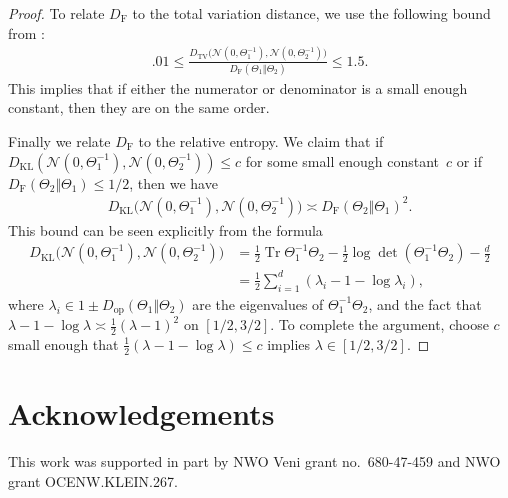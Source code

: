 \documentclass[aos]{imsart}
\theoremstyle{definition}
\numberwithin{equation}{section}
\DeclareMathOperator{\tr}{Tr}
\newcommand{\DF}{D_{\operatorname{F}}}
\newcommand{\Dop}{D_{\operatorname{op}}}
\newcommand{\DKL}{D_{\operatorname{KL}}}
\newcommand{\DTV}{D_{\operatorname{TV}}}
\begin{document}
\begin{appendix}
\begin{proof}
To relate $\DF$ to the total variation distance, we use the following bound from \cite{devroye2018total}:
\begin{align*}
  .01  \leq \frac{\DTV\bigl(\mathcal{N}(0, \Theta_1^{-1}), \mathcal{N}(0, \Theta_2^{-1})\bigr)}{\DF(\Theta_1 \Vert  \Theta_2)} \leq 1.5.
\end{align*}
This implies that if either the numerator or denominator is a small enough constant, then they are on the same order.

Finally we relate $\DF$ to the relative entropy.
We claim that if $\DKL(\mathcal{N}(0, \Theta_1^{-1}), \mathcal{N}(0, \Theta_2^{-1})) \leq c$ for some small enough constant~$c$ or if $\DF(\Theta_2 \Vert  \Theta_1) \leq 1/2$, then we have
\begin{align*}
  \DKL\bigl(\mathcal{N}(0, \Theta_1^{-1}), \mathcal{N}(0, \Theta_2^{-1})\bigr) \asymp \DF(\Theta_2 \Vert  \Theta_1)^2.
\end{align*}
This bound can be seen explicitly from the formula
\begin{align*}
  \DKL\bigl(\mathcal{N}(0, \Theta_1^{-1}), \mathcal{N}(0, \Theta_2^{-1})\bigr)
&= \frac{1}{2} \tr \Theta_1^{-1} \Theta_2 - \frac{1}{2}\log\det(\Theta_1^{-1} \Theta_2) - \frac{d}{2}\\
& = \frac{1}{2} \sum_{i =1}^d (\lambda_i -1 -  \log \lambda_i),
\end{align*}
where $\lambda_i \in 1 \pm \Dop(\Theta_1\Vert \Theta_2)$ are the eigenvalues of $\Theta_1^{-1} \Theta_2$,
and the fact that $\lambda - 1 -\log\lambda \asymp \frac12 (\lambda - 1)^2$ on $[1/2, 3/2]$.
To complete the argument, choose $c$ small enough that $\frac{1}{2}(\lambda - 1 -\log\lambda) \leq c$ implies $\lambda \in [1/2, 3/2]$.
\end{proof}
\end{appendix}


\section*{Acknowledgements}
This work was supported in part by NWO Veni grant no.~680-47-459 and NWO grant OCENW.KLEIN.267.




\end{document}
